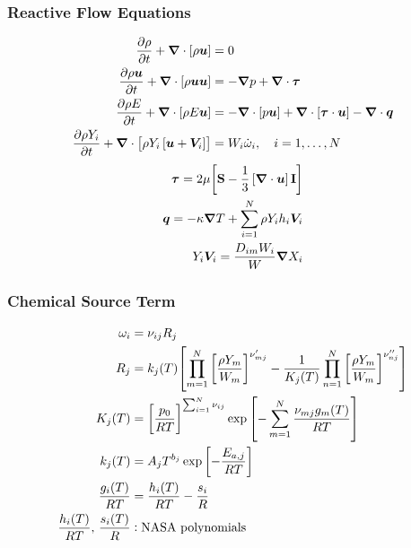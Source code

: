 \begin{frame}\frametitle{Reactive Flow Equations}
  \begin{align*}
    \frac{\partial \rho}{\partial t} + \mbox{\boldmath{$\nabla$}}\cdot\left[  \rho \boldsymbol{u}  \right] &= 0 \\
    \frac{\partial  \rho\boldsymbol{u} }{\partial t} + \mbox{\boldmath{$\nabla$}}\cdot\left[  \rho \boldsymbol{u}\boldsymbol{u}  \right] &= -\mbox{\boldmath{$\nabla$}} p + \mbox{\boldmath{$\nabla$}}\cdot\boldsymbol{\tau} \\
    \frac{\partial  \rho E }{\partial t} + \mbox{\boldmath{$\nabla$}}\cdot\left[  \rho E \boldsymbol{u}  \right] &= -\mbox{\boldmath{$\nabla$}}\cdot\left[  p\boldsymbol{u}  \right] + \mbox{\boldmath{$\nabla$}}\cdot\left[  \boldsymbol{\tau} \cdot \boldsymbol{u}  \right] - \mbox{\boldmath{$\nabla$}}\cdot\boldsymbol{q} \\
    \frac{\partial \rho Y_{i}}{\partial t} + \mbox{\boldmath{$\nabla$}}\cdot{\left[  \rho Y_{i}\ensuremath{\left[  \boldsymbol{u} + \boldsymbol{V}_{i}  \right]}  \right]} &= W_{i}\dot{\omega}_{i},\quad i = 1,\dots,N
  \end{align*}
  \begin{align*}
    \boldsymbol{\tau} = 2\mu{\left[  \mathbf{S} - \frac{1}{3}\ensuremath{\left[  \mbox{\boldmath{$\nabla$}}\cdot\boldsymbol{u}  \right]}\mathbf{I}  \right]}\\
    \boldsymbol{q} = -\kappa\mbox{\boldmath{$\nabla$}} T + \sum_{i = 1}^{N}\rho Y_{i} h_{i}\boldsymbol{V}_{i} \\
    Y_{i}\boldsymbol{V}_{i} = \frac{D_{im}W_{i}}{W}\mbox{\boldmath{$\nabla$}} X_{i}\\
  \end{align*}
\end{frame}

\begin{frame}\frametitle{Chemical Source Term}
  \begin{align*}
    \omega_{i} &= \nu_{ij}R_{j} \\
    R_{j} &= k_{j}(T){\left[  \prod_{m = 1}^{N}\left[ \frac{\rho Y_{m}}{W_{m}} \right]^{\nu_{mj}^{\prime}} - \frac{1}{K_{j}(T)}\prod_{n = 1}^{N}\left[ \frac{\rho Y_{m}}{W_{m}} \right]^{\nu_{nj}^{\prime\prime}}   \right]} \\
    K_{j}(T) &= \left[  \frac{p_{0}}{RT}  \right]^{\sum_{i = 1}^{N}\nu_{ij}}\exp{\left[  -\sum_{m = 1}^{N} \frac{\nu_{mj}g_{m}(T)}{RT}  \right]} \\
    k_{j}(T) &= A_{j} T^{b_{j}}\exp\left[  -\frac{E_{a,j}}{RT}  \right] \\
    \frac{g_{i}(T)}{RT} &= \frac{h_{i}(T)}{RT} - \frac{s_{i}}{R} \\
    \frac{h_{i}(T)}{RT},\,\frac{s_{i}(T)}{R} &: \text{NASA polynomials}
  \end{align*}
\end{frame}

